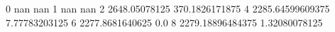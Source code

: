 0 nan nan
1 nan nan
2 2648.05078125 370.1826171875
4 2285.64599609375 7.77783203125
6 2277.8681640625 0.0
8 2279.18896484375 1.32080078125

